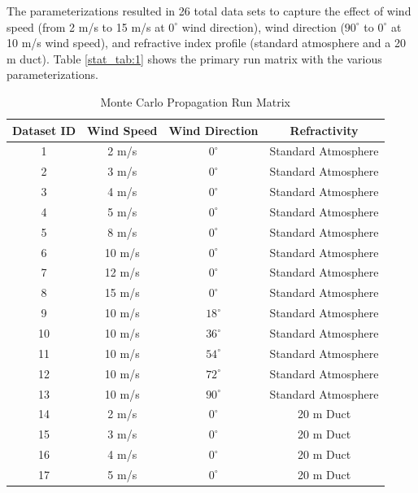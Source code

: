 The parameterizations resulted in 26 total data sets to capture the effect of wind speed (from 2 m/s to 15 m/s at $0^{\circ}$ wind direction), wind direction ($90^{\circ}$ to $0^{\circ}$ at 10 m/s wind speed), and refractive index profile (standard atmosphere and a 20 m duct). Table \ref{stat_tab:1} shows the primary run matrix with the various parameterizations. 

\begin{table}[H]
  \begin{center}
      \renewcommand{\baselinestretch}{1} \small\normalsize
  \begin{quote}
    \caption[Monte Carlo Propagation Run Matrix]{Monte Carlo Propagation Run Matrix\label{stat_tab:0}}
  \end{quote}
  \begin{tabular} {|c | c | c| c |}
    \hline
  \bf{Dataset ID} & \bf{Wind Speed} & \bf{Wind Direction} & \bf{Refractivity}  \\ \hline
  1 & 2 m/s & $0^{\circ}$ & Standard Atmosphere \\ \hline
  2 & 3 m/s & $0^{\circ}$ & Standard Atmosphere \\ \hline
  3 & 4 m/s & $0^{\circ}$ & Standard Atmosphere \\ \hline
  4 & 5 m/s & $0^{\circ}$ & Standard Atmosphere \\ \hline
  5 & 8 m/s & $0^{\circ}$ & Standard Atmosphere \\ \hline
  6 & 10 m/s & $0^{\circ}$ & Standard Atmosphere \\ \hline
  7 & 12 m/s & $0^{\circ}$ & Standard Atmosphere \\ \hline
  8 & 15 m/s & $0^{\circ}$ & Standard Atmosphere \\ \hline
  9 & 10 m/s & $18^{\circ}$ & Standard Atmosphere \\ \hline
  10 & 10 m/s & $36^{\circ}$ & Standard Atmosphere \\ \hline
  11 & 10 m/s & $54^{\circ}$ &  Standard Atmosphere\\ \hline
  12 & 10 m/s & $72^{\circ}$ &  Standard Atmosphere \\ \hline
  13 & 10 m/s & $90^{\circ}$ &  Standard Atmosphere \\ \hline
  14 & 2 m/s & $0^{\circ}$ & 20 m Duct \\ \hline
  15 & 3 m/s & $0^{\circ}$ & 20 m Duct \\ \hline
  16 & 4 m/s & $0^{\circ}$ & 20 m Duct \\ \hline
  17 & 5 m/s & $0^{\circ}$ & 20 m Duct \\ \hline

\end{tabular}
\end{center}
\end{table}
